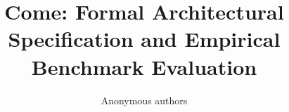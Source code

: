 \title{\textbf{Come: Formal Architectural Specification and Empirical Benchmark Evaluation}}

\author{Anonymous authors}
